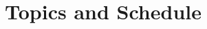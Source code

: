 \documentclass[10pt,letterpaper]{article}
\begin{document}







\section{Topics and Schedule}
\end{document}

